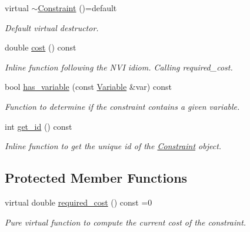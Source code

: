 \begin{DoxyCompactItemize}
virtual \hyperlink{classghost_1_1Constraint_aebea8263c24d0c3a5328c20ee0006f32}{$\sim$\+Constraint} ()=default
\begin{DoxyCompactList}\small\item\em Default virtual destructor. \end{DoxyCompactList}\item 
double \hyperlink{classghost_1_1Constraint_adfa4826bcaea9e4a692fb0c4630ca214}{cost} () const 
\begin{DoxyCompactList}\small\item\em Inline function following the N\+VI idiom. Calling required\+\_\+cost. \end{DoxyCompactList}\item 
bool \hyperlink{classghost_1_1Constraint_a38945fa5e732b91d51c0eedfec9a99e3}{has\+\_\+variable} (const \hyperlink{classghost_1_1Variable}{Variable} \&var) const 
\begin{DoxyCompactList}\small\item\em Function to determine if the constraint contains a given variable. \end{DoxyCompactList}\item 
int \hyperlink{classghost_1_1Constraint_af483429a319284503ff634105cadbe08}{get\+\_\+id} () const 
\begin{DoxyCompactList}\small\item\em Inline function to get the unique id of the \hyperlink{classghost_1_1Constraint}{Constraint} object. \end{DoxyCompactList}\end{DoxyCompactItemize}
\subsection*{Protected Member Functions}
\begin{DoxyCompactItemize}
\item 
virtual double \hyperlink{classghost_1_1Constraint_a6ef4cd03a4dc864a8d308e55044c615d}{required\+\_\+cost} () const =0
\begin{DoxyCompactList}\small\item\em Pure virtual function to compute the current cost of the constraint. \end{DoxyCompactList}\end{DoxyCompactItemize}
